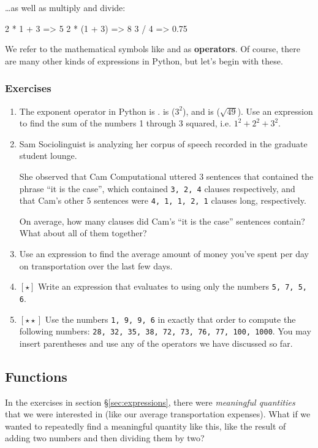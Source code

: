 \documentclass{article}
\let\oldref\ref
\renewcommand\ref{\S\oldref}
\newcommand\pyi\pythoninline
\newcommand\hard{$[\star]$ }
\newcommand\harder{$[\star\star]$ }
\newcounter{exercisei}
\newenvironment{exercises}{
\subsubsection*{Exercises}
\begin{enumerate} 
\setcounter{enumi}{\value{exercisei}}
}{
\setcounter{exercisei}{\value{enumi}}
\end{enumerate}
\clearpage
}
\begin{document}
\noindent \ldots as well as multiply and divide:

\begin{python}
2 * 1 + 3
=> 5
2 * (1 + 3)
=> 8
3 / 4
=> 0.75
\end{python}

\noindent We refer to the mathematical symbols like \pyi{+} and \pyi{/} as \textbf{operators}. Of course, there are many other kinds of expressions in Python, but let's begin with these.

\begin{exercises}
\item The exponent operator in Python is \pyi{**}. \pyi{3 ** 2} is \pyi{9} ($3^2$), and \pyi{49 ** (1/2)} is \pyi{7} ($\sqrt{49}$). Use an expression to find the sum of the numbers 1 through 3 squared, i.e. $1^2 + 2^2 + 3^2$.
\item Sam Sociolinguist is analyzing her corpus of speech recorded in the graduate student lounge. 

She observed that Cam Computational uttered 3 sentences that contained the phrase ``it is the case'', which contained {\tt 3, 2, 4} clauses respectively, and that Cam's other 5 sentences were {\tt 4, 1, 1, 2, 1} clauses long, respectively. 

On average, how many clauses did Cam's ``it is the case'' sentences contain? What about all of them together?

\item Use an expression to find the average amount of money you've spent per day on transportation over the last few days.
\item \hard Write an expression that evaluates to \pyi{24} using only the numbers {\tt 5, 7, 5, 6}. 
\item \harder Use the numbers {\tt 1, 9, 9, 6} in exactly that order to compute the following numbers: {\tt 28, 32, 35, 38, 72, 73, 76, 77, 100, 1000}. You may insert parentheses and use any of the operators we have discussed so far.
\end{exercises}

\subsection{Functions}
\label{sec:functions}

In the exercises in section \ref{sec:expressions}, there were \emph{meaningful quantities} that we were interested in (like our average transportation expenses). What if we wanted to repeatedly find a meaningful quantity like this, like the result of adding two numbers and then dividing them by two? 
\end{document}
